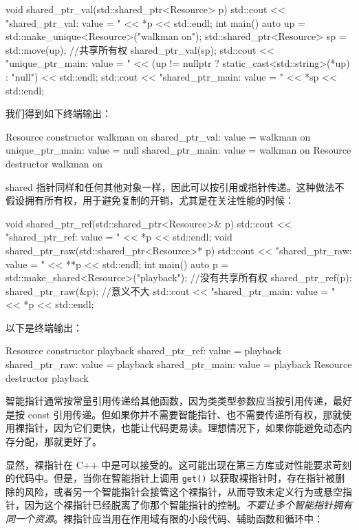 \begin{codebox}[cpp]
void shared_ptr_val(std::shared_ptr<Resource> p) {
    std::cout << "shared_ptr_val: value = " << *p << std::endl;
}
int main() {
    auto up = std::make_unique<Resource>("walkman on");
    std::shared_ptr<Resource> sp = std::move(up);
    //共享所有权
    shared_ptr_val(sp);
    std::cout << "unique_ptr_main: value = "
              << (up != nullptr ? static_cast<std::string>(*up) : "null")
              << std::endl;
    std::cout << "shared_ptr_main: value = " << *sp << std::endl;
}
\end{codebox}

我们得到如下终端输出：

\begin{codebox}[text]
Resource constructor walkman on
shared_ptr_val: value = walkman on
unique_ptr_main: value = null
shared_ptr_main: value = walkman on
Resource destructor walkman on
\end{codebox}

\label{idx:458}
shared 指针同样和任何其他对象一样，因此可以按引用或指针传递。这种做法不假设拥有所有权，用于避免复制的开销，尤其是在关注性能的时候：

\begin{codebox}[cpp]
void shared_ptr_ref(std::shared_ptr<Resource>& p) {
  std::cout << "shared_ptr_ref: value = " << *p << std::endl;
}
void shared_ptr_raw(std::shared_ptr<Resource>* p) {
  std::cout << "shared_ptr_raw: value = " << **p << std::endl;
}
int main() {
  auto p = std::make_shared<Resource>("playback");
  //没有共享所有权
  shared_ptr_ref(p);
  shared_ptr_raw(&p);  //意义不大
  std::cout << "shared_ptr_main: value = " << *p << std::endl;
}
\end{codebox}

以下是终端输出：

\begin{codebox}[text]
Resource constructor playback
shared_ptr_ref: value = playback
shared_ptr_raw: value = playback
shared_ptr_main: value = playback
Resource destructor playback
\end{codebox}

智能指针通常按常量引用传递给其他函数，因为类类型参数应当按引用传递，最好是按 const 引用传递。但如果你并不需要智能指针、也不需要传递所有权，那就使用裸指针，因为它们更快，也能让代码更易读。理想情况下，如果你能避免动态内存分配，那就更好了。

显然，裸指针在 C++ 中是可以接受的。这可能出现在第三方库或对性能要求苛刻的代码中。但是，当你在智能指针上调用 \texttt{get()} 以获取裸指针时，存在指针被删除的风险，或者另一个智能指针会接管这个裸指针，从而导致未定义行为或悬空指针，因为这个裸指针已经脱离了你那个智能指针的控制。\emph{不要让多个智能指针拥有同一个资源}。裸指针应当用在作用域有限的小段代码、辅助函数和循环中：

